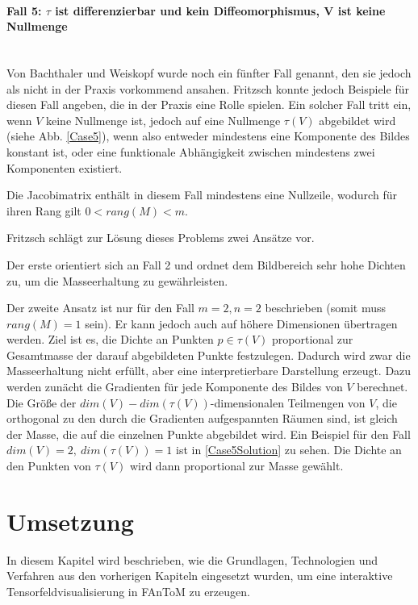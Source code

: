 \documentclass[a4paper,fontsize=12pt,toc=bib,halfparskip]{scrartcl}
\begin{document}
\paragraph{Fall 5: $\tau$ ist differenzierbar und kein Diffeomorphismus, V ist keine Nullmenge}\mbox{}\\
Von Bachthaler und Weiskopf wurde noch ein f\"unfter Fall genannt, den sie jedoch als nicht in der Praxis vorkommend ansahen. Fritzsch konnte jedoch Beispiele f\"ur diesen Fall angeben\cite[S.~23~f.]{fritzsch2016continuousScatterplot}, die in der Praxis eine Rolle spielen. Ein solcher Fall tritt ein, wenn $V$ keine Nullmenge ist, jedoch auf eine Nullmenge $\tau(V)$ abgebildet wird (siehe Abb. \ref{Case5}), wenn also entweder mindestens eine Komponente des Bildes konstant ist, oder eine funktionale Abh\"angigkeit zwischen mindestens zwei Komponenten existiert. 

Die Jacobimatrix enth\"alt in diesem Fall mindestens eine Nullzeile, wodurch f\"ur ihren Rang gilt $0 < rang(M) < m$. 

Fritzsch schl\"agt zur L\"osung dieses Problems zwei Ans\"atze vor. 

Der erste orientiert sich an Fall 2 und ordnet dem Bildbereich sehr hohe Dichten zu, um die Masseerhaltung zu gew\"ahrleisten. 

Der zweite Ansatz ist nur f\"ur den Fall $m=2, n=2$ beschrieben (somit muss $rang(M) = 1$ sein). Er kann jedoch auch auf h\"ohere Dimensionen \"ubertragen werden. Ziel ist es, die Dichte an Punkten $p\in\tau(V)$ proportional zur Gesamtmasse der darauf abgebildeten Punkte festzulegen. Dadurch wird zwar die Masseerhaltung nicht erf\"ullt, aber eine interpretierbare Darstellung erzeugt. Dazu werden zun\"acht die Gradienten f\"ur jede Komponente des Bildes von $V$ berechnet. Die Gr\"o{\ss}e der $dim(V) - dim(\tau(V))$-dimensionalen Teilmengen von $V$, die orthogonal zu den durch die Gradienten aufgespannten R\"aumen sind, ist gleich der Masse, die auf die einzelnen Punkte abgebildet wird. Ein Beispiel f\"ur den Fall $dim(V) = 2,~dim(\tau(V)) = 1$ ist in \ref{Case5Solution} zu sehen. Die Dichte an den Punkten von $\tau(V)$ wird dann proportional zur Masse gew\"ahlt.

\section{Umsetzung}
\label{sec:Umsetzung}
In diesem Kapitel wird beschrieben, wie die Grundlagen, Technologien und Verfahren aus den vorherigen Kapiteln eingesetzt wurden, um eine interaktive Tensorfeldvisualisierung in FAnToM zu erzeugen.
\end{document}
